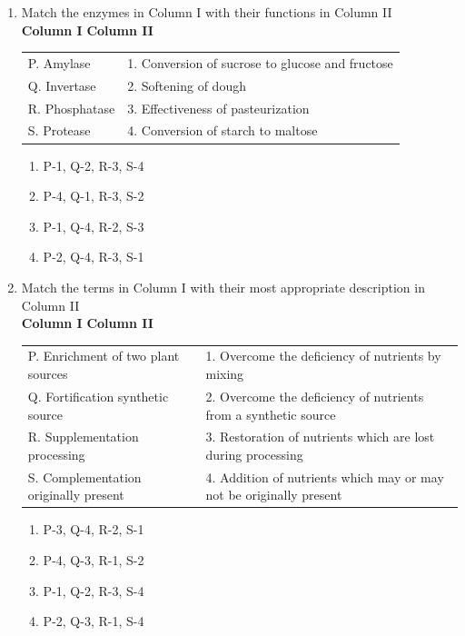 \documentclass[journal,12pt,onecolumn]{IEEEtran}
\begin{document}
\begin{enumerate}[label=\arabic*.,resume]
\item Match the enzymes in Column I with their functions in Column II \\

\textbf{Column I} \hspace{4cm} \textbf{Column II} \\[6pt]

\begin{tabular}{p{6cm} p{9cm}}
P. Amylase      & 1. Conversion of sucrose to glucose and fructose \\
Q. Invertase    & 2. Softening of dough \\
R. Phosphatase  & 3. Effectiveness of pasteurization \\
S. Protease     & 4. Conversion of starch to maltose \\
\end{tabular}


\begin{multicols}{2}
\begin{enumerate}[label=(\Alph*)]
\item P-1, Q-2, R-3, S-4
\item P-4, Q-1, R-3, S-2
\item P-1, Q-4, R-2, S-3
\item P-2, Q-4, R-3, S-1
\end{enumerate}
\end{multicols}

\item Match the terms in Column I with their most appropriate description in Column II \\

\textbf{Column I} \hspace{4cm} \textbf{Column II} \\[6pt]

\begin{tabular}{p{6cm} p{8cm}}
P. Enrichment of two plant sources & 1. Overcome the deficiency of nutrients by mixing \\
Q. Fortification synthetic source & 2. Overcome the deficiency of nutrients from a synthetic source \\
R. Supplementation processing & 3. Restoration of nutrients which are lost during processing \\
S. Complementation originally present & 4. Addition of nutrients which may or may not be originally present \\
\end{tabular}


\begin{multicols}{2}
\begin{enumerate}[label=(\Alph*)]
\item P-3, Q-4, R-2, S-1
\item P-4, Q-3, R-1, S-2
\item P-1, Q-2, R-3, S-4
\item P-2, Q-3, R-1, S-4
\end{enumerate}
\end{multicols}


\end{enumerate}
\end{document}
